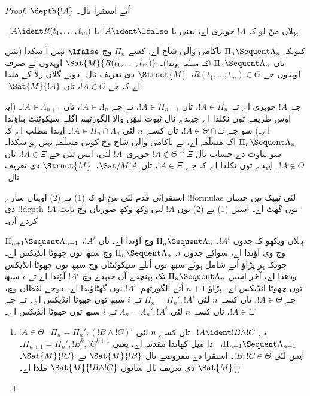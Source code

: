 \documentclass[../../../include/open-logic-section]{subfiles}
\begin{document}
\begin{proof}
$\depth{!A}$ اُتے استقرا نال۔

پہلاں منّ لو کہ $!A$ جوہری اے، یعنی یا $!A \ident \lfalse$ یا $!A
\ident R(t_1, \dots, t_m)$۔

کیونکہ $\Pi_n \Sequent \Lambda_n$ ناکامی والی شاخ اے، کسے $ \Pi_n$ وچ $ \lfalse$ نہیں آ سکدا (نئیں تاں $ \Pi_n \Sequent \Lambda_n$ اک مسلّمہ ہوندا)۔ $\Sat{M}{R(t_1, \dots, t_m)}$ اوہدوں تے صرف اوہدوں جے $R(t_1, \dots, t_m) \in
\Theta$،~$\Struct{M}$ دی تعریف نال۔ دونے گلاں رلا کے ملدا اے کہ جے $!A \in
\Theta$، تاں $\Sat{M}{!A}$۔

جے $!A$ جوہری اے تے $!A \in \Pi_n$، تاں $!A \in \Pi_{n+1}$، تے جے $!A \in \Lambda_n$، تاں $!A \in \Lambda_{n+1}$۔ (ایہ اوس طریقے توں نکلدا اے جیہدے نال ثبوت لبھّن والا الگورتھم اگلے سیکوئنٹ بناؤندا اے۔) سو جے $!A \in \Theta \cap \Xi$، تاں کسے~$n$ لئی $!A \in \Pi_n \cap
\Lambda_n$۔ ایہدا مطلب اے کہ $\Pi_n \Sequent \Lambda_n$ اک مسلّمہ اے، تے ناکامی والی شاخ وچ کوئی مسلّمہ نہیں ہو سکدا۔ سو بناوٹ دے حساب نال $!A \notin \Theta
\cap \Xi$ جوہری~$!A$ لئی، ایس لئی جے $!A \in
\Xi$، تاں $!A \notin \Theta$۔ ایہدے توں نکلدا اے کہ جے $!A \in \Xi$، تاں $\Sat/{M}{!A}$،~$\Struct{M}$ دی تعریف نال۔

استقرائی قدم لئی منّ لو کہ (1) تے (2) اوہناں سارے !!{formula}s لئی ٹھیک نیں جیہناں دی !!{depth}~$!A$ توں گھٹ اے۔ اسیں (1) تے (2) نوں $!A$ لئی وکھ وکھ صورتاں وچ ثابت کردے آں۔

پہلاں ویکھو کہ جدوں $!A^i$، $ \Pi_n \Sequent \Lambda_n$ وچ آؤندا اے، تاں $!A^i$، $ \Pi_{n+1} \Sequent \Lambda_{n+1}$ وچ وی آؤندا اے، سوائے جدوں $i$، $ \Pi_n \Sequent \Lambda_n$ وچ سبھ توں چھوٹا انڈیکس اے۔ چونکہ ہر پڑاؤ اُتے شامل ہوئے سبھ توں اُتلے سیکوئنٹاں وچ سبھ توں چھوٹا انڈیکس ودھدا اے، آخر اسیں $ \Pi_n \Sequent \Lambda_n$ تک پہنچدے آں جیہدے وچ $!A^i$ آؤندا اے تے $i$ سبھ توں چھوٹا انڈیکس اے۔ پڑاؤ $n+1$ اُتے الگورتھم~$!A^i$ نوں گھٹاؤندا اے۔ دوجے لفظاں وچ، جے $!A \in \Theta$، تاں کسے $n$ لئی $ \Pi_n = \Pi_n',
!A^i$ تے $i$ سبھ توں چھوٹا انڈیکس اے۔ تے جے $!A \in \Xi$، تاں کسے $n$ لئی $ \Lambda_n = \Lambda_n', !A^i$ تے $i$ سبھ توں چھوٹا انڈیکس اے۔

\begin{enumerate}
  \item $!A \in \Theta$ تے $!A \ident !B \land !C$۔ تاں کسے $n$ لئی $ \Pi_n = \Pi_n', (!B \land !C)^i$۔ $\Pi_{n+1} \Sequent
  \Lambda_{n+1}$،~\LeftR{\land} دا میل کھاندا مقدمہ اے، یعنی $ \Pi_{n+1} = \Pi_n', !B^k, !C^{k+1}$۔ ایس لئی $!B, !C \in
  \Theta$۔ استقرا دے مفروضے نال $ \Sat{M}{!B}$ تے $ \Sat{M}{!C}$۔ $\Sat{M}{}$ دی تعریف نال سانوں $ \Sat{M}{!B \land !C}$ ملدا اے۔


\end{enumerate}
\end{proof}
\end{document}
